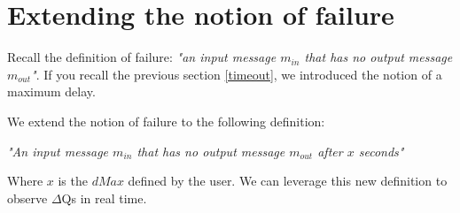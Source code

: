 \section{Extending the notion of failure}
   Recall the definition of failure: \textit{"an input message $m_{in}$ that has no output message $m_{out}$"}. If you recall the previous section \ref{timeout}, we introduced the notion of a maximum delay.

    We extend the notion of failure to the following definition:
        \begin{center}
            \textit{"An input message $m_{in}$ that has no output message $m_{out}$ after $x$ seconds"}
        \end{center}
    Where $x$ is the $dMax$ defined by the user. We can leverage this new definition to observe $\Delta$Qs in real time.

